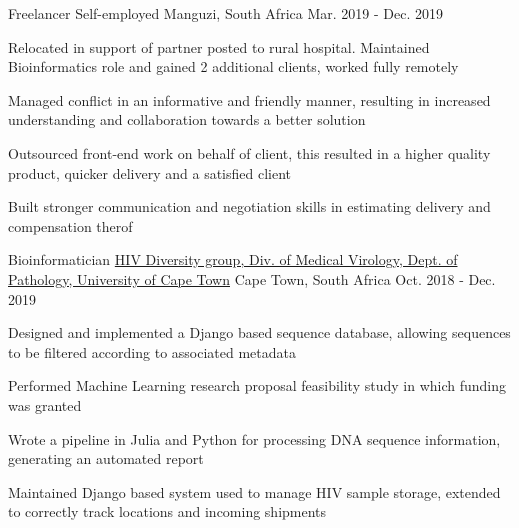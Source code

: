 

\begin{cventries}

  \cventry
    {Freelancer} %
    {Self-employed} %
    {Manguzi, South Africa} %
    {Mar. 2019 - Dec. 2019} %
    {
      \begin{cvitems} %
        \item {Relocated in support of partner posted to rural hospital. Maintained Bioinformatics role and gained 2 additional clients, worked fully remotely}
        \item {Managed conflict in an informative and friendly manner, resulting in increased understanding and collaboration towards a better solution}
        \item {Outsourced front-end work on behalf of client, this resulted in a higher quality product, quicker delivery and a satisfied client}
        \item {Built stronger communication and negotiation skills in estimating delivery and compensation therof}
      \end{cvitems}
    }

  \cventry
    {Bioinformatician} %
    {\href{http://www.virology.uct.ac.za/vir/research/hiv-diversity-group}{HIV Diversity group, Div. of Medical Virology, Dept. of Pathology, University of Cape Town}} %
    {Cape Town, South Africa} %
    {Oct. 2018 - Dec. 2019} %
    {
      \begin{cvitems} %
        \item {Designed and implemented a Django based sequence database, allowing sequences to be filtered according to associated metadata}
        \item {Performed Machine Learning research proposal feasibility study in which funding was granted}
        \item {Wrote a pipeline in Julia and Python for processing DNA sequence information, generating an automated report}
        \item {Maintained Django based system used to manage HIV sample storage, extended to correctly track locations and incoming shipments}
      \end{cvitems}
    }


\end{cventries}
